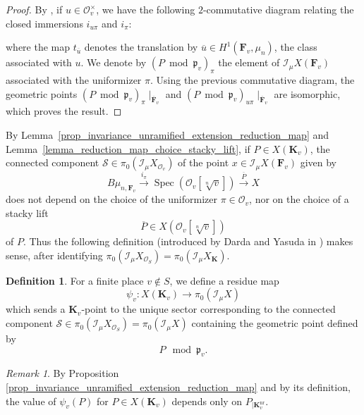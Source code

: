 \documentclass{proc-l}
\newcommand{\K}{\mathbf{K}}
\newcommand{\F}{\mathbf{F}}
\newcommand{\I}{\mathcal{I}}
\DeclareMathOperator{\Spec}{Spec}
\DeclareMathOperator{\un}{nr}
\newcommand{\stackS}{\mathcal{S}}
\newcommand{\sheafI}{\mathcal{I}}
\newcommand{\sheafO}{\mathcal{O}}
\newcommand{\sector}{\pi_0(\sheafI_{\mu} X)}
\theoremstyle{definition}
\newtheorem{definition}[theorem]{Definition}
\theoremstyle{remark}
\newtheorem{remark}[theorem]{Remark}
\numberwithin{equation}{section}
\begin{document}
\begin{proof}
By \cite[Lemma 4.3]{loughran_santens_malle_conjecture}, if $u \in \sheafO_v^{\times}$, we have the following $2$-commutative diagram relating the closed immersions $i_{u \pi}$ and $i_{\pi}$:

\begin{center}
\end{center}where the map $t_{\overline u}$ denotes the translation by $\overline u \in H^1(\F_v,\mu_n)$, the class associated with $u$. We denote by $(P \bmod \mathfrak{p}_v)_{\pi}$ the element of $\I_{\mu}X(\F_v)$ associated with the uniformizer $\pi$. Using the previous commutative diagram, the geometric points $(P \bmod \mathfrak{p}_v)_{\pi}\!\mid_{\overline{\F}_v}$ and $(P \bmod \mathfrak{p}_v)_{u\pi}\!\mid_{\overline{\F}_v}$ are isomorphic, which proves the result.
\end{proof}

By Lemma~\ref{prop_invariance_unramified_extension_reduction_map} and Lemma~\ref{lemma_reduction_map_choice_stacky_lift}, if $P \in X(\K_v)$, the connected component $\stackS \in \pi_0(\I_{\mu} X_{\sheafO_v})$ of the point $x \in \I_{\mu}X(\F_v)$ given by
$$
B\mu_{n,\F_v}
\xrightarrow{i_{\pi}}
\Spec(\sheafO_v[\sqrt[n]{v}])
\xrightarrow{\overline P}
X
$$
does not depend on the choice of the uniformizer $\pi \in \sheafO_v$, nor on the choice of a stacky lift
$$
\overline{P} \in X(\sheafO_v[\sqrt[n]{v}])
$$
of $P$. Thus the following definition (introduced by Darda and Yasuda in \cite[Definition 2.17]{darda2024batyrevmanin}) makes sense, after identifying $\pi_0(\I_{\mu} X_{\sheafO_S}) = \pi_0(\I_{\mu} X_{\K})$.

\begin{definition}\label{definition_residue_map}
For a finite place $v \not\in S$, we define a residue map
$$
\psi_v : X(\K_v) \rightarrow \sector
$$
which sends a $\K_v$-point to the unique sector corresponding to the connected component $\stackS \in \pi_0(\I_{\mu} X_{\sheafO_S}) = \sector$ containing the geometric point defined by $$P \mod \mathfrak{p}_v .$$
\end{definition}

\begin{remark}
By Proposition \ref{prop_invariance_unramified_extension_reduction_map} and by its definition, the value of $\psi_v(P)$ for $P \in X(\K_v)$ depends only on $P_{| \K_v^{\un}}$.
\end{remark}
\end{document}

